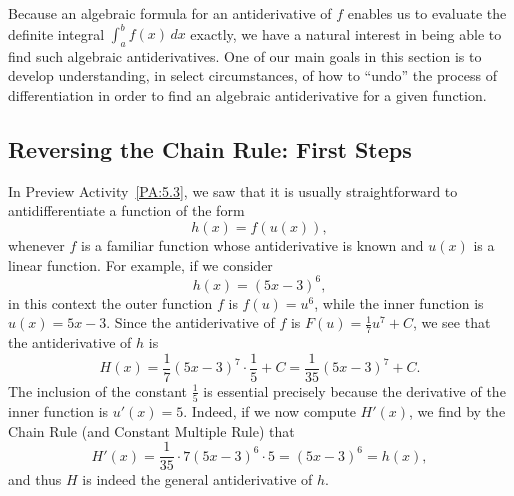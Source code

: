 Because an algebraic formula for an antiderivative of $f$ enables us to evaluate the definite integral $\int_a^b f(x) \, dx$ exactly, we have a natural interest in being able to find such algebraic antiderivatives.  One of our main goals in this section is to develop understanding, in select circumstances, of how to ``undo'' the process of differentiation in order to find an algebraic antiderivative for a given function.


\subsection*{Reversing the Chain Rule: First Steps} 

In Preview Activity~\ref{PA:5.3}, we saw that it is usually straightforward to antidifferentiate a function of the form
\[ h(x) = f(u(x)), \]
whenever $f$ is a familiar function whose antiderivative is known and $u(x)$ is a linear function.  For example, if we consider
\[ h(x) = (5x-3)^6, \]
in this context the outer function $f$ is $f(u) = u^6$, while the inner function is $u(x) = 5x - 3$.  Since the antiderivative of $f$ is $F(u) = \frac{1}{7}u^7+C$, we 
see that the antiderivative of $h$ is
\[ H(x) = \frac{1}{7} (5x-3)^7 \cdot \frac{1}{5} + C = \frac{1}{35} (5x-3)^7 + C. \]
The inclusion of the constant $\frac{1}{5}$ is essential precisely because the derivative of the inner function is $u'(x) = 5$.  Indeed, if we now compute $H'(x)$, we find by the Chain Rule (and Constant Multiple Rule) that
\[ H'(x) = \frac{1}{35} \cdot 7(5x-3)^6 \cdot 5 = (5x-3)^6 = h(x), \]
and thus $H$ is indeed the general antiderivative of $h$.


 

